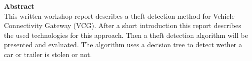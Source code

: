 \vspace*{2cm}
\vspace{10ex}
{\bf\Large Abstract} \\ [1em]

This written workshop report describes a theft detection method for Vehicle Connectivity Gateway (VCG). After a short introduction this report describes the used technologies for this approach. Then a theft detection algorithm will be presented and evaluated. The algorithm uses a decision tree to detect wether a car or trailer is stolen or not. 

\cleardoublepage
